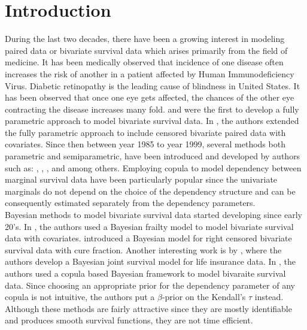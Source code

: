 \documentclass[11pt]{article}
\theoremstyle{remboldstyle}
\begin{document}
\section{Introduction}
\label{sec:intr}
\noindent
During the last two decades, there have been a growing interest in modeling paired data or bivariate survival data which arises primarily from the field of medicine. It has been medically observed that incidence of one disease often increases the risk of another in a patient affected by Human Immunodeficiency Virus. Diabetic retinopathy is the leading cause of blindness in United States. It has been observed that once one eye gets affected, the chances of the other eye contracting the disease increases many fold. \cite{clayton:1978} and \cite{oakes:1982} were the first to develop a fully parametric approach to model bivariate survival data. In \cite{huster:brookmeyer:self:1989}, the authors extended the fully parametric approach to include censored bivariate paired data with covariates. Since then between year 1985 to year 1999, several methods both parametric and semiparametric, have been introduced and developed by authors such as: \cite{nelson:1986}, \cite{oakes:1986}, \cite{shih:louis:1995}, \cite{genest:1993} and \cite{wang:wells:2000} among others. Employing copula to model dependency between marginal survival data have been particularly popular since the univariate marginals do not depend on the choice of the dependency structure and can be consequently estimated separately from the dependency parameters.\\
Bayesian methods to model bivariate survival data started developing since early 20's. In \cite{sahu:dey:2000}, the authors used a Bayesian frailty model to model bivariate survival data with covariates. \cite{chen:ibra:sinh:2002} introduced a Bayesian model for right censored bivariate survival data with cure fraction. Another interesting work is by \cite{shem:youn:2000}, where the authors develop a Bayesian joint survival model for life insurance data. In \cite{romeo:tanaka:2006}, the authors used a copula based Bayesian framework to model bivaraite survival data. Since choosing an appropriate prior for the dependency parameter of any copula is not intuitive, the authors put a $\beta$-prior on the Kendall's $\tau$ instead. Although these methods are fairly attractive since they are mostly identifiable and produces smooth survival functions, they are not time efficient.
\end{document}
